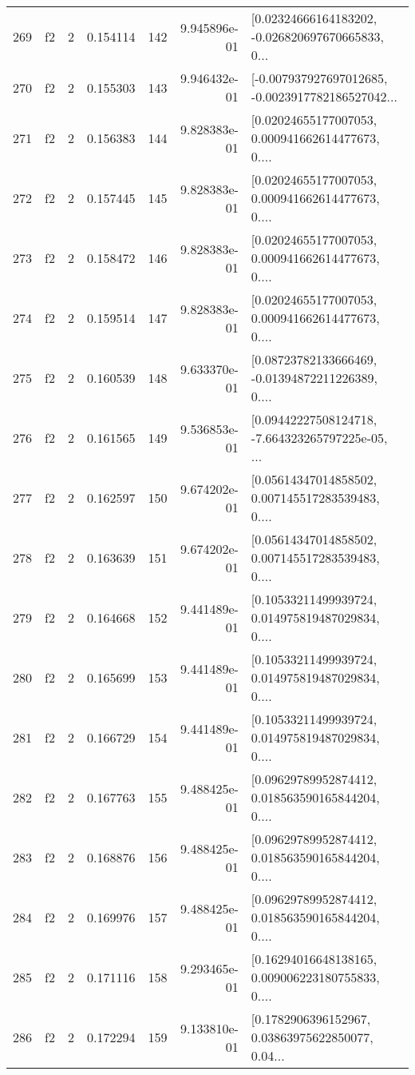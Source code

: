 \begin{tabular}{lllrlrl}
269 &  f2 &   2 &  0.154114 &  142 &  9.945896e-01 &  [0.02324666164183202, -0.026820697670665833, 0... \\
270 &  f2 &   2 &  0.155303 &  143 &  9.946432e-01 &  [-0.007937927697012685, -0.0023917782186527042... \\
271 &  f2 &   2 &  0.156383 &  144 &  9.828383e-01 &  [0.02024655177007053, 0.000941662614477673, 0.... \\
272 &  f2 &   2 &  0.157445 &  145 &  9.828383e-01 &  [0.02024655177007053, 0.000941662614477673, 0.... \\
273 &  f2 &   2 &  0.158472 &  146 &  9.828383e-01 &  [0.02024655177007053, 0.000941662614477673, 0.... \\
274 &  f2 &   2 &  0.159514 &  147 &  9.828383e-01 &  [0.02024655177007053, 0.000941662614477673, 0.... \\
275 &  f2 &   2 &  0.160539 &  148 &  9.633370e-01 &  [0.08723782133666469, -0.01394872211226389, 0.... \\
276 &  f2 &   2 &  0.161565 &  149 &  9.536853e-01 &  [0.09442227508124718, -7.664323265797225e-05, ... \\
277 &  f2 &   2 &  0.162597 &  150 &  9.674202e-01 &  [0.05614347014858502, 0.007145517283539483, 0.... \\
278 &  f2 &   2 &  0.163639 &  151 &  9.674202e-01 &  [0.05614347014858502, 0.007145517283539483, 0.... \\
279 &  f2 &   2 &  0.164668 &  152 &  9.441489e-01 &  [0.10533211499939724, 0.014975819487029834, 0.... \\
280 &  f2 &   2 &  0.165699 &  153 &  9.441489e-01 &  [0.10533211499939724, 0.014975819487029834, 0.... \\
281 &  f2 &   2 &  0.166729 &  154 &  9.441489e-01 &  [0.10533211499939724, 0.014975819487029834, 0.... \\
282 &  f2 &   2 &  0.167763 &  155 &  9.488425e-01 &  [0.09629789952874412, 0.018563590165844204, 0.... \\
283 &  f2 &   2 &  0.168876 &  156 &  9.488425e-01 &  [0.09629789952874412, 0.018563590165844204, 0.... \\
284 &  f2 &   2 &  0.169976 &  157 &  9.488425e-01 &  [0.09629789952874412, 0.018563590165844204, 0.... \\
285 &  f2 &   2 &  0.171116 &  158 &  9.293465e-01 &  [0.16294016648138165, 0.009006223180755833, 0.... \\
286 &  f2 &   2 &  0.172294 &  159 &  9.133810e-01 &  [0.1782906396152967, 0.03863975622850077, 0.04... \\

\end{tabular}
